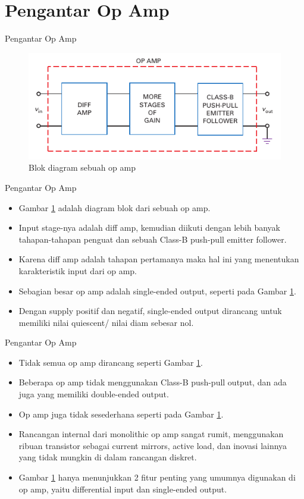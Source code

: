 \section{Pengantar Op Amp}

\begin{frame}{Pengantar Op Amp}
\begin{figure}
	\centering
	\includegraphics[width=0.8\linewidth]{gambar/fig-16.01}
	\caption{Blok diagram sebuah op amp}
	\label{fig-16.01}
\end{figure}
\end{frame}

\begin{frame}{Pengantar Op Amp}
	\begin{itemize}
		\item Gambar \ref{fig-16.01} adalah diagram blok dari sebuah op amp.
		\item Input stage-nya adalah diff amp, kemudian diikuti dengan lebih banyak tahapan-tahapan penguat dan sebuah Class-B push-pull emitter follower.
		\item Karena diff amp adalah tahapan pertamanya maka hal ini yang menentukan karakteristik input dari op amp.
		\item Sebagian besar op amp adalah single-ended output, seperti pada Gambar \ref{fig-16.01}.
		\item Dengan supply positif dan negatif, single-ended output dirancang untuk memiliki nilai quiescent/ nilai diam sebesar nol.
	\end{itemize}
\end{frame}

\begin{frame}{Pengantar Op Amp}
	\begin{itemize}
		\item Tidak semua op amp dirancang seperti Gambar \ref{fig-16.01}.
		\item Beberapa op amp tidak menggunakan Class-B push-pull output, dan ada juga yang memiliki double-ended output.
		\item Op amp juga tidak sesederhana seperti pada Gambar \ref{fig-16.01}.
		\item Rancangan internal dari monolithic op amp sangat rumit, menggunakan ribuan transistor sebagai current mirrors, active load, dan inovasi lainnya yang tidak mungkin di dalam rancangan diskret.
		\item Gambar \ref{fig-16.01} hanya menunjukkan 2 fitur penting yang umumnya digunakan di op amp, yaitu differential input dan single-ended output.
	\end{itemize}
\end{frame}

